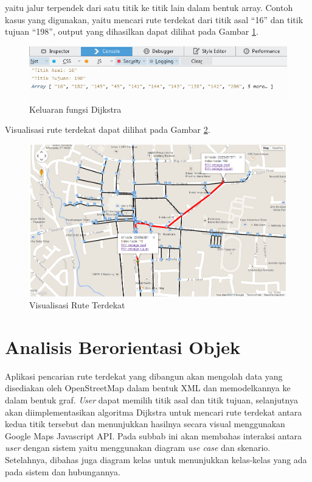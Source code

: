 yaitu jalur terpendek dari satu titik ke titik lain dalam bentuk array. Contoh
kasus yang digunakan, yaitu mencari rute terdekat dari titik asal ``16'' dan 
titik tujuan ``198'', output yang dihasilkan dapat dilihat pada Gambar
\ref{fig:output_dijkstra}.
\begin{figure}[h]
\centering
\includegraphics[scale=0.8]{Gambar/output_dijkstra}
\caption[Keluaran fungsi Dijkstra]{Keluaran fungsi Dijkstra}
\label{fig:output_dijkstra}
\end{figure}
Visualisasi rute terdekat dapat dilihat pada Gambar
\ref{fig:visualisasi_dijkstra}.
 \begin{figure}[h]
\centering
\includegraphics[scale=0.5]{Gambar/visualisasi_dijkstra}
\caption[Visualisasi Rute Terdekat]{Visualisasi Rute Terdekat}
\label{fig:visualisasi_dijkstra}
\end{figure}

\section{Analisis Berorientasi Objek}
Aplikasi pencarian rute terdekat yang dibangun akan mengolah data yang
disediakan oleh OpenStreetMap dalam bentuk XML dan memodelkannya ke dalam bentuk graf. 
\textit{User} dapat memilih titik asal dan titik tujuan, selanjutnya akan
diimplementasikan algoritma Dijkstra untuk mencari rute terdekat antara kedua titik 
tersebut dan menunjukkan hasilnya secara visual menggunakan Google Maps
Javascript API. Pada subbab ini akan membahas interaksi antara \textit{user}
dengan sistem yaitu menggunakan diagram \textit{use case} dan skenario. Setelahnya,
dibahas juga diagram kelas untuk menunjukkan kelas-kelas yang ada pada sistem
dan hubungannya.

